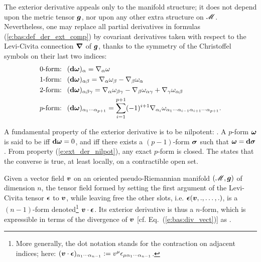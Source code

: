\begin{remark}
The exterior derivative appeals only to the
manifold structure; it does not depend upon the metric tensor $\bm{g}$, nor upon
any other extra structure on $\mathscr{M}$.
Nevertheless, one may replace
all partial derivatives in formulas (\ref{e:bas:def_der_ext_comp})
by covariant derivatives taken with respect to the Levi-Civita connection $\bm{\nabla}$
of $\bm{g}$,
thanks to the symmetry of the Christoffel symbols on their last two indices:
\begin{subequations}
\begin{align}
    \mbox{0-form: \ } & (\mathbf{d}\bm{\omega})_\alpha =
        \nabla_\alpha \omega \label{e:bas:def_ext_0f_nab} \\
    \mbox{1-form: \ } & (\mathbf{d}\bm{\omega})_{\alpha\beta} =
        \nabla_\alpha \omega_\beta - \nabla_\beta \omega_\alpha
            \label{e:bas:def_ext_1f_nab} \\
    \mbox{2-form: \ } & (\mathbf{d}\bm{\omega})_{\alpha\beta\gamma} =
    \nabla_\alpha\omega_{\beta\gamma} -
    \nabla_\beta\omega_{\alpha\gamma} +
    \nabla_\gamma\omega_{\alpha\beta} \label{e:bas:def_ext_2f_nab} \\
         \mbox{$p$-form: \ }  &
     (\mathbf{d}\bm{\omega})_{\alpha_1\cdots\alpha_{p+1}} =
     \sum_{i=1}^{p+1} (-1)^{i+1} \nabla_{\alpha_i}
     \omega_{\alpha_1\cdots\alpha_{i-1}\alpha_{i+1}\cdots\alpha_{p+1}} .
\end{align}
\end{subequations}
\end{remark}

A fundamental property of the exterior derivative is to be nilpotent:
\be \label{e:ext_der_nilpot}
    .
\ee
A $p$-form $\bm{\omega}$ is said to be  iff $\mathbf{d}\bm{\omega}=0$,
and  iff there exists a $(p-1)$-form $\bm{\sigma}$ such that
$\bm{\omega} = \mathbf{d}\bm{\sigma}$. From property (\ref{e:ext_der_nilpot}),
any exact $p$-form is closed. The  states that the converse is true,
at least locally, on a contractible open set.

Given a vector field $\bm{v}$ on an oriented pseudo-Riemannian manifold $(\mathscr{M},\bm{g})$ of dimension $n$,
the tensor field formed by setting the first argument of the
Levi-Civita tensor $\bm{\epsilon}$ to $\bm{v}$, while leaving free the other slots, i.e. $\bm{\epsilon}(\bm{v},.,\ldots,.)$,
is a $(n-1)$-form
denoted\footnote{More generally, the dot notation stands for the contraction on adjacent indices; here: $(\bm{v}\cdot\bm{\epsilon})_{\alpha_1\cdots\alpha_{n-1}} := v^\mu \epsilon_{\mu\alpha_1\cdots\alpha_{n-1}}$.}
$\bm{v}\cdot\bm{\epsilon}$. Its exterior
derivative is thus a $n$-form, which is expressible in terms of the divergence
of $\bm{v}$ [cf. Eq.~(\ref{e:bas:div_vect})] as
\be \label{e:bas:dveps_divv}
    .
\ee

